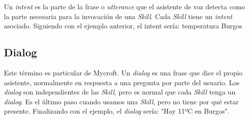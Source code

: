 Un \textit{intent} es la parte de la frase o \textit{utterance} que el asistente de voz detecta como la parte necesaria para la invocación de una \textit{Skill}. Cada \textit{Skill} tiene un \textit{intent} asociado. Siguiendo con el ejemplo anterior, el intent sería: temperatura Burgos

\subsection{Dialog}

Este término es particular de Mycroft. Un \textit{dialog} es una frase que dice el propio asistente, normalmente en respuesta a una pregunta por parte del usuario. Los \textit{dialog} son independientes de las \textit{Skill}, pero es normal que cada \textit{Skill} tenga un \textit{dialog}. Es el último paso cuando usamos una \textit{Skill}, pero no tiene por qué estar presente. Finalizando con el ejemplo, el \textit{dialog} sería: "Hay 11ºC en Burgos".